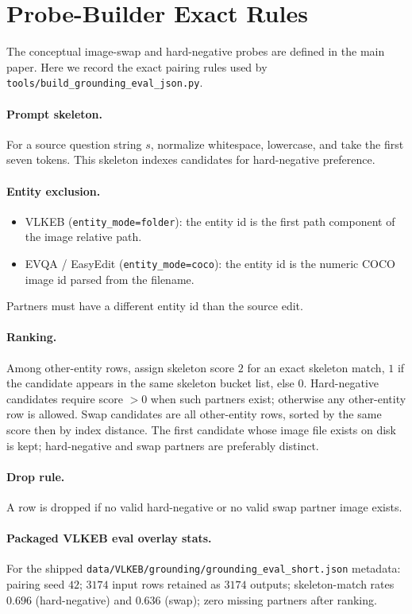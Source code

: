 \documentclass[letterpaper]{article}
\begin{document}
\section{Probe-Builder Exact Rules}
The conceptual image-swap and hard-negative probes are defined in the main paper.
Here we record the exact pairing rules used by \texttt{tools/build\_grounding\_eval\_json.py}.

\paragraph{Prompt skeleton.}
For a source question string $s$, normalize whitespace, lowercase, and take the first seven tokens.
This skeleton indexes candidates for hard-negative preference.

\paragraph{Entity exclusion.}
\begin{itemize}
\item VLKEB (\texttt{entity\_mode=folder}): the entity id is the first path component of the image relative path.
\item EVQA / EasyEdit (\texttt{entity\_mode=coco}): the entity id is the numeric COCO image id parsed from the filename.
\end{itemize}
Partners must have a different entity id than the source edit.

\paragraph{Ranking.}
Among other-entity rows, assign skeleton score $2$ for an exact skeleton match, $1$ if the candidate appears in the same skeleton bucket list, else $0$.
Hard-negative candidates require score ${>}0$ when such partners exist; otherwise any other-entity row is allowed.
Swap candidates are all other-entity rows, sorted by the same score then by index distance.
The first candidate whose image file exists on disk is kept; hard-negative and swap partners are preferably distinct.

\paragraph{Drop rule.}
A row is dropped if no valid hard-negative or no valid swap partner image exists.

\paragraph{Packaged VLKEB eval overlay stats.}
For the shipped \texttt{data/VLKEB/grounding/grounding\_eval\_short.json} metadata: pairing seed $42$; $3174$ input rows retained as $3174$ outputs; skeleton-match rates $0.696$ (hard-negative) and $0.636$ (swap); zero missing partners after ranking.
\end{document}

